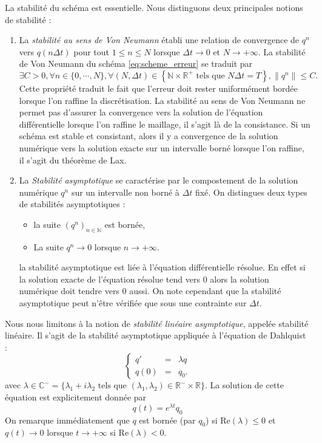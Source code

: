 La stabilité du schéma est essentielle. Nous distinguons deux principales notions de stabilité :
\begin{enumerate}
\item La \textit{stabilité au sens de Von Neumann} établi une relation de convergence de $q^n$ vers $q(n \Delta t)$ pour tout $1 \leq n \leq N$ lorsque $\Delta t \rightarrow 0$ et $N \rightarrow + \infty$. 
La stabilité de Von Neumann du schéma \eqref{eq:scheme_erreur} se traduit par
\begin{equation}
\exists C >0, \forall n \in \{ 0 , \cdots , N \}, \forall (N, \Delta t) \in \left\lbrace \mathbb{N} \times \mathbb{R}^+ \text{ tels que } N \Delta t = T \right\rbrace, \| q^n \| \leq C.
\end{equation}
Cette propriété traduit le fait que l'erreur doit rester uniformément bordée lorsque l'on raffine la discrétisation. La stabilité au sens de Von Neumann ne permet pas d'assurer la convergence vers la solution de l'équation différentielle lorsque l'on raffine le maillage, il s'agit là de la consistance. Si un schéma est stable et consistant, alors il y a convergence de la solution numérique vers la solution exacte sur un intervalle borné lorsque l'on raffine, il s'agit du théorème de Lax.

\item La \textit{Stabilité asymptotique} se caractérise par le compostement de la solution numérique $q^n$ sur un intervalle non borné à $\Delta t$ fixé. On distingues deux types de stabilités asymptotiques :
\begin{itemize}
\item la suite $(q^n)_{n \in \mathbb{N}}$ est bornée,
\item La suite $q^n \rightarrow 0$ lorsque $n \rightarrow + \infty$.
\end{itemize}
la stabilité asymptotique est liée à l'équation différentielle résolue. En effet si la solution exacte de l'équation résolue tend vers $0$ alors la solution numérique doit tendre vers $0$ aussi. On note cependant que la stabilité asymptotique peut n'être vérifiée que sous une contrainte sur $\Delta t$.
\end{enumerate} 

Nous nous limitons à la notion de \textit{stabilité linéaire asymptotique}, appelée stabilité linéaire. Il s'agit de la stabilité asymptotique appliquée à l'équation de Dahlquist :
\begin{equation}
\left\lbrace 
\begin{array}{rcl}
q' & = & \lambda q \\
q(0) & = & q_0.
\end{array}
\right.
\label{eq:dahlquist}
\end{equation}
avec $\lambda \in \mathbb{C}^- = \{ \lambda_1 + i \lambda_2 \text{ tels que } (\lambda_1, \lambda_2) \in \mathbb{R}^- \times \mathbb{R} \}$. La solution de cette équation est explicitement donnée par 
\begin{equation}
q(t) = e^{\lambda t} q_0
\end{equation}
On remarque immédiatement que $q$ est bornée (par $q_0$) si Re$(\lambda) \leq 0$ et $q(t) \rightarrow 0$ lorsque $t \rightarrow + \infty$ si Re$(\lambda) <0$.

